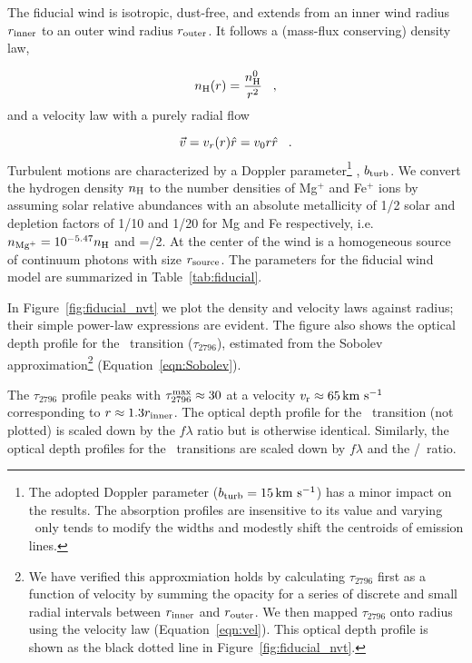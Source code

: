 \documentclass[12pt,preprint]{aastex}
\begin{document}
The fiducial wind is isotropic, dust-free, and extends from an inner wind
radius $r_{\rm inner}$ to an outer wind radius $r_{\rm outer}$.  
It follows a (mass-flux conserving) density law,

\begin{equation}
n_{\rm H} (r) = \frac{n^0_{\rm H}}{r^2} \;\;\; , 
\label{eqn:density}
\end{equation}
and a velocity law with a purely radial flow

\begin{equation}
\vec v = v_r (r) \hat r = v_0 r \hat r  \;\;\; .
\label{eqn:vel}
\end{equation}
Turbulent motions are
characterized by a Doppler parameter\footnote{
  The adopted Doppler parameter
  ($b_{\rm turb} = 15 \, {\rm km~s^{-1}}$) has a minor impact on the results.
  The absorption profiles are insensitive to its value and varying \bturb\
  only tends to modify the widths and modestly
  shift the centroids of emission lines.} 
, $b_{\rm turb}$.  
We convert the hydrogen density $n_{\rm H}$ to the number densities of
Mg$^+$ and Fe$^+$ ions by assuming solar relative abundances with an
absolute metallicity of 1/2 solar and depletion factors of 1/10 and
1/20 for Mg and Fe respectively, i.e.\  $n_{\rm Mg^+} = 10^{-5.47} n_{\rm H}$ 
and \nfe=\nmg/2. At the center of the wind is a homogeneous source of
continuum photons with size $r_{\rm source}$. The parameters for the
fiducial wind model are summarized in Table~\ref{tab:fiducial}.   

In Figure~\ref{fig:fiducial_nvt} we plot the density and velocity
laws against radius;  
their simple power-law expressions are evident.  The figure also
shows the optical depth profile for the \mgiia\ transition
($\tau_{2796}$), estimated from the Sobolev approximation\footnote{We
  have verified this approxmiation holds by calculating 
  $\tau_{2796}$ first
  as a function of velocity by summing the opacity for a series of
  discrete and small radial intervals
  between $r_{\rm inner}$  and $r_{\rm outer}$.   We then mapped
  $\tau_{2796}$ onto radius using the velocity law
  (Equation~\ref{eqn:vel}). This optical depth profile is shown as the
black dotted line in Figure~\ref{fig:fiducial_nvt}.}
(Equation~\ref{eqn:Sobolev}). 

The $\tau_{2796}$ profile peaks with $\tau_{2796}^{\rm max} \approx 30$
at a velocity $v_{\rm r} \approx 65 \, {\rm km~s^{-1}}$ corresponding to $r \approx 1.3
r_{\rm inner}$.  The optical depth profile for the \mgiib\ transition
(not plotted) is scaled down by the $f\lambda$ ratio but is otherwise identical.  Similarly,
the optical depth profiles for the \feiid\ transitions are
scaled down by $f \lambda$ and the \nfe/\nmg\ ratio.  
\end{document}
